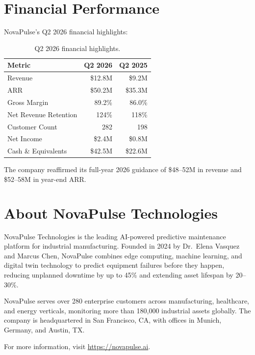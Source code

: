 \documentclass[
    language=english,
    doctype=press-release,
    institution=none,
]{../../omnilatex}
\begin{document}
\section*{Financial Performance}

NovaPulse's Q2 2026 financial highlights:

\begin{table}[h]
    \centering
    \begin{tabular}{lrr}
        \toprule
        \textbf{Metric} & \textbf{Q2 2026} & \textbf{Q2 2025} \\
        \midrule
        Revenue              & \$12.8M  & \$9.2M   \\
        ARR                  & \$50.2M  & \$35.3M  \\
        Gross Margin         & 89.2\%   & 86.0\%   \\
        Net Revenue Retention & 124\%   & 118\%    \\
        Customer Count       & 282      & 198      \\
        Net Income           & \$2.4M   & \$0.8M   \\
        Cash \& Equivalents  & \$42.5M  & \$22.6M  \\
        \bottomrule
    \end{tabular}
    \caption{Q2 2026 financial highlights.}
\end{table}

The company reaffirmed its full-year 2026 guidance of \$48--52M in revenue
and \$52--58M in year-end ARR.

\section*{About NovaPulse Technologies}

NovaPulse Technologies is the leading AI-powered predictive maintenance
platform for industrial manufacturing. Founded in 2024 by Dr.\ Elena Vasquez
and Marcus Chen, NovaPulse combines edge computing, machine learning, and
digital twin technology to predict equipment failures before they happen,
reducing unplanned downtime by up to 45\% and extending asset lifespan by
20--30\%.

NovaPulse serves over 280 enterprise customers across manufacturing,
healthcare, and energy verticals, monitoring more than 180,000 industrial
assets globally. The company is headquartered in San Francisco, CA, with
offices in Munich, Germany, and Austin, TX.

For more information, visit \url{https://novapulse.ai}.
\end{document}
